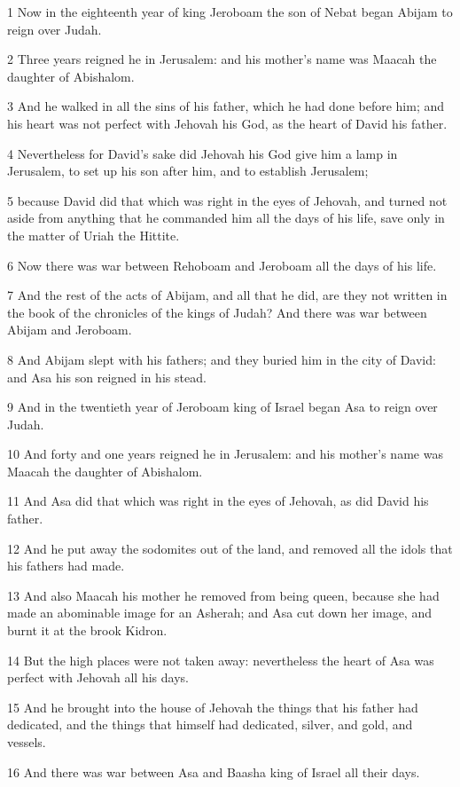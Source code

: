 \par 1 Now in the eighteenth year of king Jeroboam the son of Nebat began Abijam to reign over Judah.
\par 2 Three years reigned he in Jerusalem: and his mother's name was Maacah the daughter of Abishalom.
\par 3 And he walked in all the sins of his father, which he had done before him; and his heart was not perfect with Jehovah his God, as the heart of David his father.
\par 4 Nevertheless for David's sake did Jehovah his God give him a lamp in Jerusalem, to set up his son after him, and to establish Jerusalem;
\par 5 because David did that which was right in the eyes of Jehovah, and turned not aside from anything that he commanded him all the days of his life, save only in the matter of Uriah the Hittite.
\par 6 Now there was war between Rehoboam and Jeroboam all the days of his life.
\par 7 And the rest of the acts of Abijam, and all that he did, are they not written in the book of the chronicles of the kings of Judah? And there was war between Abijam and Jeroboam.
\par 8 And Abijam slept with his fathers; and they buried him in the city of David: and Asa his son reigned in his stead.
\par 9 And in the twentieth year of Jeroboam king of Israel began Asa to reign over Judah.
\par 10 And forty and one years reigned he in Jerusalem: and his mother's name was Maacah the daughter of Abishalom.
\par 11 And Asa did that which was right in the eyes of Jehovah, as did David his father.
\par 12 And he put away the sodomites out of the land, and removed all the idols that his fathers had made.
\par 13 And also Maacah his mother he removed from being queen, because she had made an abominable image for an Asherah; and Asa cut down her image, and burnt it at the brook Kidron.
\par 14 But the high places were not taken away: nevertheless the heart of Asa was perfect with Jehovah all his days.
\par 15 And he brought into the house of Jehovah the things that his father had dedicated, and the things that himself had dedicated, silver, and gold, and vessels.
\par 16 And there was war between Asa and Baasha king of Israel all their days.
